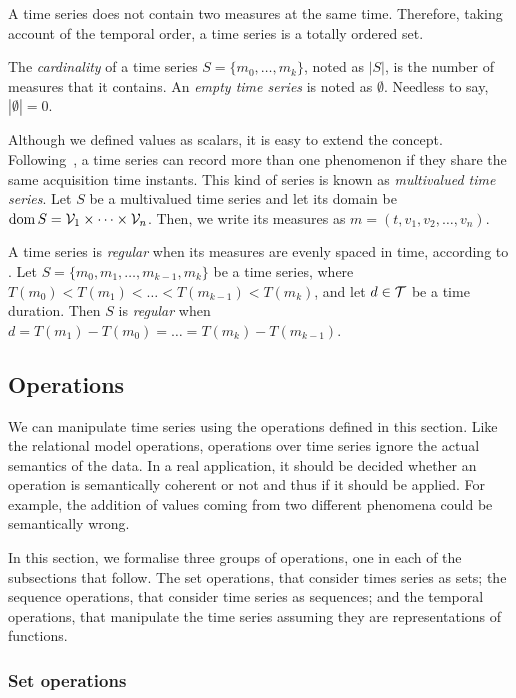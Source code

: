 A time series does not contain two measures at the same time. Therefore,
taking account of the temporal order, a time series is a totally
ordered set.

The \emph{cardinality} of a time series $S=\{m_0,\dots,m_k\}$, noted
as $|S|$, is the number of measures that it contains.  An \emph{empty
  time series} is noted as $\emptyset$. Needless to say,
$|\emptyset|=0$.

Although we defined values as scalars, it is easy to extend the
concept. Following~\cite{assfalg08:thesis}, a time series can record
more than one phenomenon if they share the same acquisition time
instants.  This kind of series is known as \emph{multivalued time
  series}. Let $S$ be a multivalued time series and let its domain be
$\operatorname{dom} S={\cal{V}}_1\times\cdots\times{\cal{V}}_n$. Then, we write its
measures as $m=(t,v_1,v_2,\ldots,v_n)$.

A time series is \emph{regular} when its measures are evenly spaced in
time, according to \cite{last:hetland}.  Let $S=\{m_0, m_1,\ldots,
m_{k-1},m_k\}$ be a time series, where
$T(m_0)<T(m_1)<\dots<T(m_{k-1})<T(m_k)$, and let $d\in\cal{T}$ be a
time duration. Then $S$ is \emph{regular} when $d=T(m_1)-T(m_0)=\dots
=T(m_k)-T(m_{k-1})$.

\subsection{Operations}
\label{sec:model:operations}

We can manipulate time series using the operations defined in this
section. Like the relational model operations, operations over time
series ignore the actual semantics of the data. In a real application,
it should be decided whether an operation is semantically coherent or
not and thus if it should be applied. For example, the addition of
values coming from two different phenomena could be semantically
wrong.

In this section, we formalise three groups of operations, one in each
of the subsections that follow. The set operations, that consider
times series as sets; the sequence operations, that consider time
series as sequences; and the temporal operations, that manipulate the
time series assuming they are representations of functions.


\subsubsection{Set operations}
\label{sec:set}

